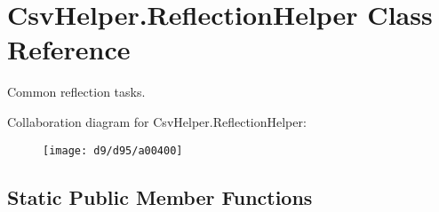 \hypertarget{a00131}{\section{Csv\-Helper.\-Reflection\-Helper Class Reference}
\label{a00131}
}


Common reflection tasks.  




Collaboration diagram for Csv\-Helper.\-Reflection\-Helper\-:
\nopagebreak
\begin{figure}[H]
\begin{center}
\leavevmode
\texttt{[image: d9/d95/a00400]}
\end{center}
\end{figure}
\subsection*{Static Public Member Functions}
